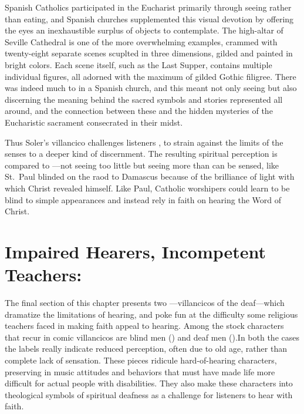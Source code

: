Spanish Catholics participated in the Eucharist primarily through seeing rather than eating,\citXXX{} and Spanish churches supplemented this visual devotion by offering the eyes an inexhaustible surplus of objects to contemplate.
The high-altar  of Seville Cathedral is one of the more overwhelming examples, crammed with twenty-eight separate scenes scuplted in three dimensions, gilded and painted in bright colors.\citXXX{}
Each scene itself, such as the Last Supper, contains multiple individual figures, all adorned with the maximum of gilded Gothic filigree.
There was indeed much to  in a Spanish church, and this meant not only seeing but also discerning the meaning behind the sacred symbols and stories represented all around, and the connection between these and the hidden mysteries of the Eucharistic sacrament consecrated in their midst.

Thus Soler's villancico challenges listeners , to strain against the limits of the senses to a deeper kind of discernment.
The resulting spiritual perception is compared to ---not seeing too little but seeing more than can be sensed, like St.\ Paul blinded on the raod to Damascus because of the brilliance of light with which Christ revealed himself.
Like Paul, Catholic worshipers could learn to be blind to simple appearances and instead rely in faith on hearing the Word of Christ.

\section[Impaired Hearers, Incompetent Teachers]{Impaired Hearers, Incompetent Teachers: }

The final section of this chapter presents two ---villancicos of the deaf---which dramatize the limitations of hearing, and poke fun at the difficulty some religious teachers faced in making faith appeal to hearing.
Among the stock characters that recur in comic villancicos are blind men () and deaf men ().
In both the cases the labels really indicate reduced perception, often due to old age, rather than complete lack of sensation.
These pieces ridicule hard-of-hearing characters, preserving in music attitudes and behaviors that must have made life more difficult for actual people with disabilities.
They also make these characters into theological symbols of spiritual deafness as a challenge for  listeners to hear with faith.

